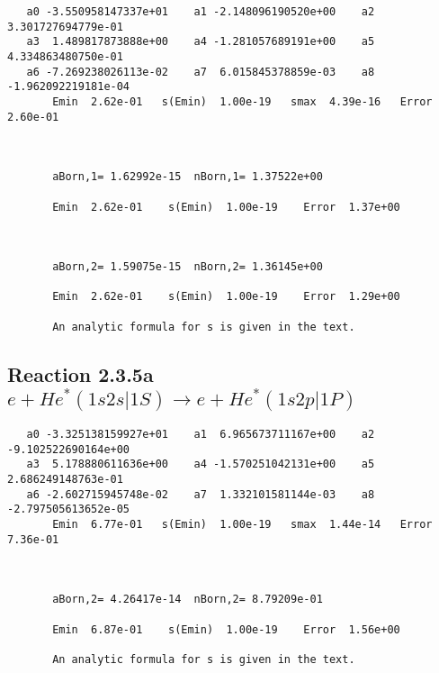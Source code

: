 \documentclass[12pt]{article}
\begin{document}
 
\begin{small}\begin{verbatim}
   a0 -3.550958147337e+01    a1 -2.148096190520e+00    a2  3.301727694779e-01
   a3  1.489817873888e+00    a4 -1.281057689191e+00    a5  4.334863480750e-01
   a6 -7.269238026113e-02    a7  6.015845378859e-03    a8 -1.962092219181e-04
       Emin  2.62e-01   s(Emin)  1.00e-19   smax  4.39e-16   Error  2.60e-01



       aBorn,1= 1.62992e-15  nBorn,1= 1.37522e+00

       Emin  2.62e-01    s(Emin)  1.00e-19    Error  1.37e+00



       aBorn,2= 1.59075e-15  nBorn,2= 1.36145e+00

       Emin  2.62e-01    s(Emin)  1.00e-19    Error  1.29e+00

       An analytic formula for s is given in the text.
\end{verbatim}\end{small}




                             


\newpage
\subsection{
Reaction 2.3.5a $   e + He^*(1s2s|1S) \rightarrow e + He^*(1s2p|1P)$}





\begin{small}\begin{verbatim}
   a0 -3.325138159927e+01    a1  6.965673711167e+00    a2 -9.102522690164e+00
   a3  5.178880611636e+00    a4 -1.570251042131e+00    a5  2.686249148763e-01
   a6 -2.602715945748e-02    a7  1.332101581144e-03    a8 -2.797505613652e-05
       Emin  6.77e-01   s(Emin)  1.00e-19   smax  1.44e-14   Error  7.36e-01



       aBorn,2= 4.26417e-14  nBorn,2= 8.79209e-01

       Emin  6.87e-01    s(Emin)  1.00e-19    Error  1.56e+00

       An analytic formula for s is given in the text.
\end{verbatim}\end{small}
\end{document}
